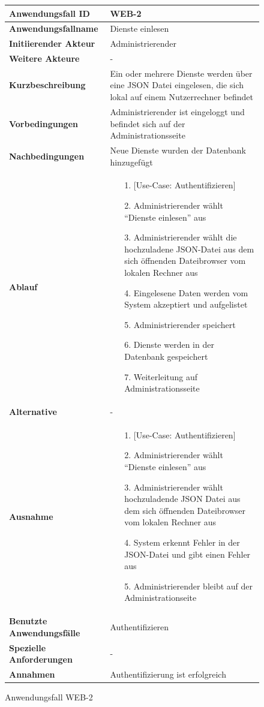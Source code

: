 \begin{figure}[h]
	\centering
	\begin{tabularx}{\textwidth}{ X | X }
		\textbf{Anwendungsfall ID} & WEB-2 \\ \hline
		\textbf{Anwendungsfallname} & Dienste einlesen \\ \hline
		\textbf{Initiierender Akteur} & Administrierender \\ \hline
		\textbf{Weitere Akteure} & - \\ \hline
		\textbf{Kurzbeschreibung} & Ein oder mehrere Dienste werden über eine JSON Datei eingelesen, die sich lokal auf einem Nutzerrechner befindet \\ \hline
		\textbf{Vorbedingungen} & Administrierender ist eingeloggt und befindet sich auf der Administrationsseite \\ \hline
		\textbf{Nachbedingungen} & Neue Dienste wurden der Datenbank hinzugefügt \\ \hline
		\textbf{Ablauf} &
		\begin{enumerate}
			\item [1.] [Use-Case: Authentifizieren]
			\item [2.] Administrierender wählt ``Dienste einlesen'' aus
			\item [3.] Administrierender wählt die hochzuladene JSON-Datei aus dem sich öffnenden Dateibrowser vom lokalen Rechner aus
			\item [4.] Eingelesene Daten werden vom System akzeptiert und aufgelistet
			\item [5.] Administrierender speichert
			\item [6.] Dienste werden in der Datenbank gespeichert
			\item [7.] Weiterleitung auf Administrationsseite
		\end{enumerate} \\ \hline
		\textbf{Alternative} & - \\ \hline
		\textbf{Ausnahme} &
		\begin{enumerate}
			\item [1.]  [Use-Case: Authentifizieren]
			\item [2.]  Administrierender wählt ``Dienste einlesen'' aus
			\item [3.]  Administrierender wählt hochzuladende JSON Datei aus dem sich öffnenden Dateibrowser vom lokalen Rechner aus
			\item [4.]  System erkennt Fehler in der JSON-Datei und gibt einen Fehler aus
			\item [5.]  Administrierender bleibt auf der Administrationseite
		\end{enumerate}  \\ \hline
		\textbf{Benutzte Anwendungsfälle} & Authentifizieren \\ \hline
		\textbf{Spezielle Anforderungen} & - \\ \hline
		\textbf{Annahmen} & Authentifizierung ist erfolgreich
	\end{tabularx}
	\caption{Anwendungsfall WEB-2}
	\label{fig:anwendungsfall-server-tabelle-web-2}
\end{figure}

